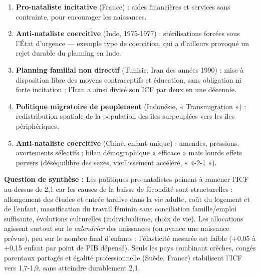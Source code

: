 \documentclass[11pt]{article}
\begin{document}
\begin{corrige}
\begin{enumerate}
    \item \textbf{Pro-nataliste incitative} (France) : aides financières et services sans contrainte, pour encourager les naissances.
    \item \textbf{Anti-nataliste coercitive} (Inde, 1975-1977) : stérilisations forcées sous l'État d'urgence — exemple type de coercition, qui a d'ailleurs provoqué un rejet durable du planning en Inde.
    \item \textbf{Planning familial non directif} (Tunisie, Iran des années 1990) : mise à disposition libre des moyens contraceptifs et éducation, sans obligation ni forte incitation ; l'Iran a ainsi divisé son ICF par deux en une décennie.
    \item \textbf{Politique migratoire de peuplement} (Indonésie, « Transmigration ») : redistribution spatiale de la population des îles surpeuplées vers les îles périphériques.
    \item \textbf{Anti-nataliste coercitive} (Chine, enfant unique) : amendes, pressions, avortements sélectifs ; bilan démographique « efficace » mais lourds effets pervers (déséquilibre des sexes, vieillissement accéléré, « 4-2-1 »).
\end{enumerate}
\textbf{Question de synthèse :} Les politiques pro-natalistes peinent à ramener l'ICF au-dessus de 2,1 car les causes de la baisse de fécondité sont structurelles : allongement des études et entrée tardive dans la vie adulte, coût du logement et de l'enfant, massification du travail féminin sans conciliation famille/emploi suffisante, évolutions culturelles (individualisme, choix de vie). Les allocations agissent surtout sur le \emph{calendrier} des naissances (on avance une naissance prévue), peu sur le nombre final d'enfants ; l'élasticité mesurée est faible (+0,05 à +0,15 enfant par point de PIB dépensé). Seuls les pays combinant crèches, congés parentaux partagés et égalité professionnelle (Suède, France) stabilisent l'ICF vers 1,7-1,9, sans atteindre durablement 2,1.
\end{corrige}
\end{document}
